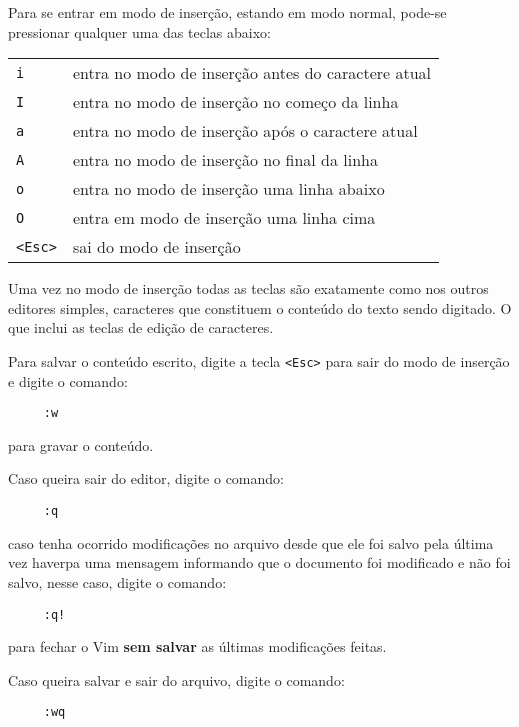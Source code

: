 Para se entrar em modo de inserção, estando em modo normal, pode-se pressionar 
qualquer uma das teclas abaixo:
\begin{table}[htb]\begin{center} \begin{tabular}{ll} \hline
     \verb|i| & entra no modo de inserção antes do caractere atual \\
     \verb|I| & entra no modo de inserção no começo da linha \\
     \verb|a| & entra no modo de inserção após o caractere atual \\
     \verb|A| & entra no modo de inserção no final da linha \\
     \verb|o| & entra no modo de inserção uma linha abaixo \\
     \verb|O| & entra em modo de inserção uma linha cima \\
     \verb|<Esc>| & sai do modo de inserção \\
\hline \end{tabular}\end{center}\end{table}

Uma vez no modo de inserção todas as teclas são exatamente 
como nos outros editores simples, caracteres que constituem o conteúdo do texto 
sendo digitado. 
O que inclui as teclas de edição de caracteres.

Para salvar o conteúdo escrito, digite a tecla \verb|<Esc>| para 
sair do modo de inserção e digite o comando:
\begin{verbatim}
     :w 
\end{verbatim}
para gravar o conteúdo.

Caso queira sair do editor, digite o comando:
\begin{verbatim}
     :q
\end{verbatim}
caso tenha ocorrido modificações no arquivo desde que ele foi salvo pela última vez
haverpa uma mensagem informando que o documento foi modificado e não foi salvo,
 nesse caso, digite o comando: 
\begin{verbatim}
     :q! 
\end{verbatim}
para fechar o Vim {\bf sem salvar} as últimas modificações feitas.

Caso queira salvar e sair do arquivo, digite o comando:
\begin{verbatim}
     :wq
\end{verbatim}

